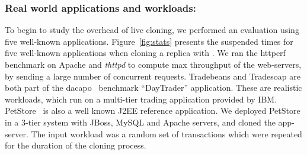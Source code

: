 \subsubsection{Real world applications and workloads:}
To begin to study the overhead of live cloning, we performed an evaluation using five well-known applications.
Figure~\ref{fig:stats} presents the suspended times for five well-known applications when cloning a replica with \parikshan. 
We ran the httperf~\cite{httperf} benchmark on Apache and \emph{thttpd} to compute max throughput of the web-servers, by sending a large number of concurrent requests.
Tradebeans and Tradesoap are both part of the dacapo~\cite{dacapo} benchmark ``DayTrader'' application.
These are realistic workloads, which run on a multi-tier trading application provided by IBM. 
PetStore~\cite{petstore} is also a well known J2EE reference application. 
We deployed PetStore in a 3-tier system with JBoss, MySQL and Apache servers, and cloned the app-server.
The input workload was a random set of transactions which were repeated for the duration of the cloning process.

